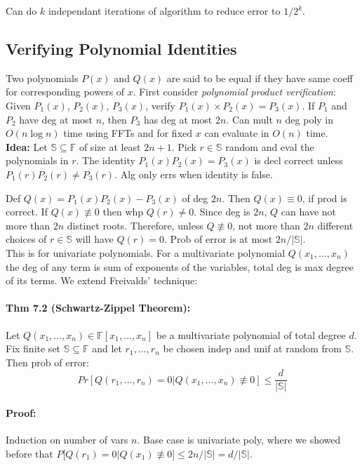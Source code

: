 \documentclass[a4paper]{article}
\begin{document}
Can do $k$ independant iterations of algorithm to reduce error to $1/2^k$.

\subsection{Verifying Polynomial Identities}
\label{sub:Verifying Polynomial Identities}
Two polynomials $P(x)$ and $Q(x)$ are said to be equal if they have same coeff for corresponding powers of $x$. First consider \textit{polynomial product verification}: Given $P_1(x)$, $P_2(x)$, $P_3(x)$, verify $P_1(x)\times P_2(x)=P_3(x)$. If $P_1$ and $P_2$ have deg at most $n$, then $P_3$ has deg at most $2n$. Can mult $n$ deg poly in $O(n\log n)$ time using FFTs and for fixed $x$ can evaluate in $O(n)$ time.\\

\textbf{Idea:} Let $\mathbb{S}\subseteq \mathbb{F}$ of size at least $2n+1$. Pick $r\in\mathbb{S}$ random and eval the polynomials in $r$. The identity $P_1(x)P_2(x)=P_3(x)$ is decl correct unless $P_1(r)P_2(r)\not=P_3(r)$. Alg only errs when identity is false.

Def $Q(x)=P_1(x)P_2(x)-P_3(x)$ of deg $2n$. Then $Q(x)\equiv 0$, if prod is correct. If $Q(x)\not\equiv 0$ then whp $Q(r)\not = 0$. Since deg is $2n$, $Q$ can have not more than $2n$ distinct roots. Therefore, unless $Q\not\equiv 0$, not more than $2n$ different choices of $r\in\mathbb{S}$ will have $Q(r)=0$. Prob of error is at most $2n/|\mathbb{S}|$.\\

This is for univariate polynomials. For a multivariate polynomial $Q(x_1,\ldots,x_n)$ the deg of any term is sum of exponents of the variables, total deg is max degree of its terms. We extend Freivalds' technique:
\paragraph{Thm 7.2 (Schwartz-Zippel Theorem):} Let $Q(x_1,\ldots,x_n)\in \mathbb{F}[x_1,\ldots,x_n]$ be a multivariate polynomial of total degree $d$. Fix finite set $\mathbb{S}\subseteq \mathbb{F}$ and let $r_1,\ldots,r_n$ be chosen indep and unif at random from $\mathbb{S}$. Then prob of error:
$$
Pr[Q(r_1,\ldots,r_n)=0| Q(x_1,\ldots,x_n)\not \equiv 0]\leq \frac{d}{|\mathbb{S}|}
$$
\paragraph{Proof:} Induction on number of vars $n$. Base case is univariate poly, where we showed before that $P[Q(r_1)=0|Q(x_1)\not\equiv 0]\leq 2n/|\mathbb{S}|=d/|\mathbb{S}|$.
\end{document}
